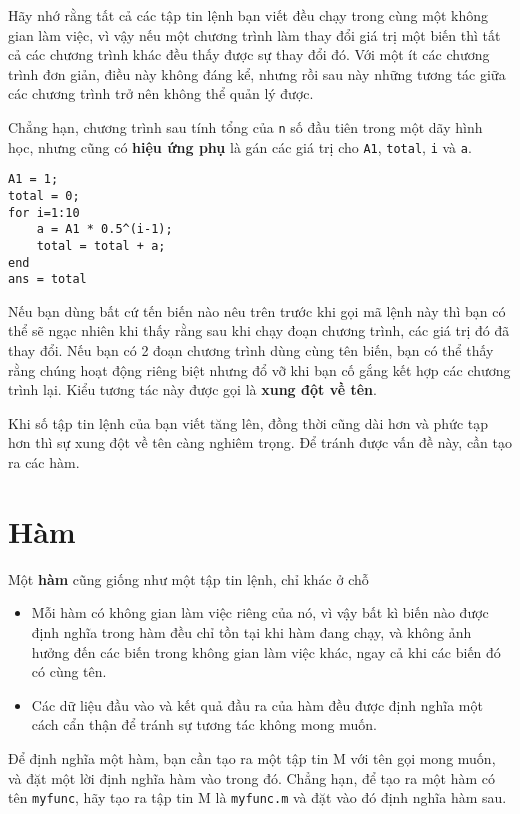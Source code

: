 \documentclass[12pt]{book}
\begin{document}
Hãy nhớ rằng tất cả các tập tin lệnh bạn viết đều chạy trong cùng
một không gian làm việc, vì vậy nếu một chương trình làm thay đổi 
giá trị một biến thì tất cả các chương trình khác đều thấy được
sự thay đổi đó. Với một ít các chương trình đơn giản, điều này
không đáng kể, nhưng rồi sau này những tương tác giữa các chương
trình trở nên không thể quản lý được.

Chẳng hạn, chương trình sau tính tổng của {\tt n} số đầu tiên
trong một dãy hình học, nhưng cũng có {\bf hiệu ứng phụ} là 
gán các giá trị cho {\tt A1}, {\tt total}, {\tt i} và {\tt a}.

\begin{verbatim}
A1 = 1;
total = 0;
for i=1:10
    a = A1 * 0.5^(i-1);
    total = total + a;
end
ans = total
\end{verbatim}
%
Nếu bạn dùng bất cứ tến biến nào nêu trên trước khi gọi mã lệnh này
thì bạn có thể sẽ ngạc nhiên khi thấy rằng sau khi chạy đoạn 
chương trình, các giá trị đó đã thay đổi. Nếu bạn có 2 đoạn chương
trình dùng cùng tên biến, bạn có thể thấy rằng chúng hoạt động
riêng biệt nhưng đổ vỡ khi bạn cố gắng kết hợp các chương trình lại.
Kiểu tương tác này được gọi là {\bf xung đột về tên}.

Khi số tập tin lệnh của bạn viết tăng lên, đồng thời cũng dài hơn
và phức tạp hơn thì sự xung đột về tên càng nghiêm trọng. Để tránh
được vấn đề này, cần tạo ra các hàm.


\section{Hàm}
\label{functions}

Một {\bf hàm} cũng giống như một tập tin lệnh, chỉ khác ở chỗ

\begin{itemize}

\item Mỗi hàm có không gian làm việc riêng của nó, vì vậy bất kì
biến nào được định nghĩa trong hàm đều chỉ tồn tại khi hàm đang
chạy, và không ảnh hưởng đến các biến trong không gian làm việc khác,
ngay cả khi các biến đó có cùng tên.

\item Các dữ liệu đầu vào và kết quả đầu ra của hàm đều được định
nghĩa một cách cẩn thận để tránh sự tương tác không mong muốn.

\end{itemize}

Để định nghĩa một hàm, bạn cần tạo ra một tập tin M với tên gọi
mong muốn, và đặt một lời định nghĩa hàm vào trong đó. Chẳng hạn, để
tạo ra một hàm có tên {\tt myfunc}, hãy tạo ra tập tin M là {\tt myfunc.m}
và đặt vào đó định nghĩa hàm sau.
\end{document}
